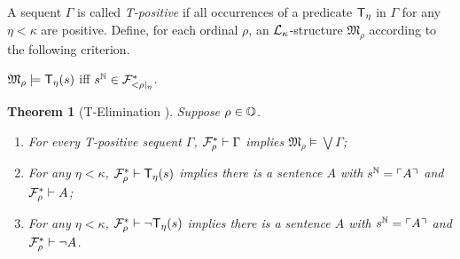 \documentclass[UKenglish,cleveref,DIV=12]{scrartcl}
\newtheorem{theorem}{Theorem}
\theoremstyle{definition}
\theoremstyle{definition}
\begin{document}
A sequent $\Gamma$ is called {\em T-positive} if all occurrences of a predicate $\mathsf{T}_\eta$ in $\Gamma$ for any $\eta<\kappa$ are positive. Define, for each ordinal $\rho$, an $\mathcal{L}_\kappa$-structure $\mathfrak{M}_\rho$ according to the following criterion.
\begin{center}
 $\mathfrak{M}_\rho\models \mathsf{T}_\eta(s)$ iff $s^\mathbb N\in\mathcal{F}^*_{<\rho|_\eta}$.
\end{center}
\begin{theorem}[T-Elimination ]\label{extlem:FFTElim}\label{extthm:FFTElim} Suppose $\rho\in\mathbb{O}$.
\begin{enumerate}
  \item For every T-positive sequent $\Gamma$, $\mathcal{F}^*_\rho\vdash\Gamma$ implies
	$\mathfrak{M}_\rho\models\bigvee\Gamma$;
  \item For any $\eta<\kappa$, $\mathcal{F}^*_\rho\vdash \mathsf{T}_\eta(s)$ implies there is a
	sentence $A$ with $s^\mathbb N=\ulcorner{A}\urcorner$ and $\mathcal{F}^*_\rho\vdash A$;
  \item For any $\eta<\kappa$, $\mathcal{F}^*_\rho\vdash \lnot \mathsf{T}_\eta(s)$ implies there
	is a sentence $A$ with $s^\mathbb N=\ulcorner{A}\urcorner$ and $\mathcal{F}^*_\rho\vdash \lnot A$.
\end{enumerate}
\end{theorem}
\end{document}
